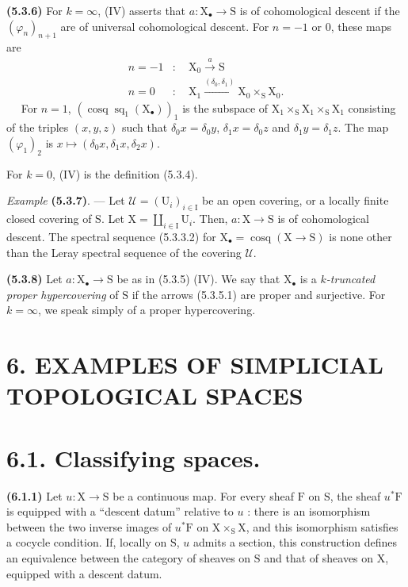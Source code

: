 \documentclass[11pt,leqno]{article}
\newcommand{\Page}[1]{\ifvmode\noindent\else\unskip\ \fi{\footnotesize\textcolor{gray}{[p.\,#1]}}\ \ignorespaces}
\begin{document}
\textbf{(5.3.6)} For \(k=\infty\), (IV) asserts that \(a:\mathrm{X}_{\bullet}\to\mathrm{S}\) is of cohomological descent if the \((\varphi_n)_{n+1}\) are of universal cohomological descent. For \(n=-1\) or \(0\), these maps are
\[
\begin{aligned}
n=-1&:\quad \mathrm{X}_0\xrightarrow{a}\mathrm{S}\\
n=0&:\quad \mathrm{X}_1\xrightarrow{(\delta_0,\delta_1)}
\mathrm{X}_0\times_{\mathrm{S}}\mathrm{X}_0.
\end{aligned}
\]
\Page{16}
For \(n=1\), \((\operatorname{cosq}\operatorname{sq}_1(\mathrm{X}_{\bullet}))_1\) is the subspace of \(\mathrm{X}_1\times_{\mathrm{S}}\mathrm{X}_1\times_{\mathrm{S}}\mathrm{X}_1\) consisting of the triples \((x,y,z)\) such that \(\delta_0x=\delta_0y\), \(\delta_1x=\delta_0z\) and \(\delta_1y=\delta_1z\). The map \((\varphi_1)_2\) is \(x\mapsto(\delta_0x,\delta_1x,\delta_2x)\).

For \(k=0\), (IV) is the definition (5.3.4).

\textit{Example} \textbf{(5.3.7)}. — Let \(\mathcal{U}=(\mathrm{U}_i)_{i\in\mathrm{I}}\) be an open covering, or a locally finite closed covering of \(\mathrm{S}\). Let \(\mathrm{X}=\coprod\limits_{i\in\mathrm{I}}\mathrm{U}_i\). Then, \(a:\mathrm{X}\to\mathrm{S}\) is of cohomological descent. The spectral sequence (5.3.3.2) for \(\mathrm{X}_{\bullet}=\operatorname{cosq}(\mathrm{X}\to\mathrm{S})\) is none other than the Leray spectral sequence of the covering \(\mathcal{U}\).

\textbf{(5.3.8)} Let \(a:\mathrm{X}_{\bullet}\to\mathrm{S}\) be as in (5.3.5) (IV). We say that \(\mathrm{X}_{\bullet}\) is a \textit{\(k\)-truncated proper hypercovering} of \(\mathrm{S}\) if the arrows (5.3.5.1) are proper and surjective. For \(k=\infty\), we speak simply of a proper hypercovering.

\section*{6. EXAMPLES OF SIMPLICIAL TOPOLOGICAL SPACES}

\section*{6.1. Classifying spaces.}

\textbf{(6.1.1)} Let \(u:\mathrm{X}\to\mathrm{S}\) be a continuous map. For every sheaf \(\mathrm{F}\) on \(\mathrm{S}\), the sheaf \(u^*\mathrm{F}\) is equipped with a “descent datum” relative to \(u\) : there is an isomorphism between the two inverse images of \(u^*\mathrm{F}\) on \(\mathrm{X}\times_{\mathrm{S}}\mathrm{X}\), and this isomorphism satisfies a cocycle condition. If, locally on \(\mathrm{S}\), \(u\) admits a section, this construction defines an equivalence between the category of sheaves on \(\mathrm{S}\) and that of sheaves on \(\mathrm{X}\), equipped with a descent datum.
\end{document}
